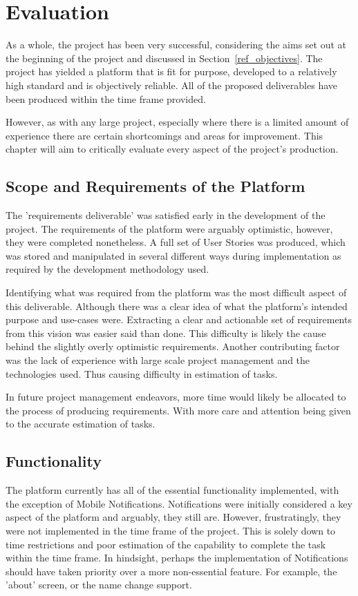 \chapter{Evaluation}
As a whole, the project has been very successful, considering the aims set out at the beginning of the project and discussed in Section~\ref{ref_objectives}. The project has yielded a platform that is fit for purpose, developed to a relatively high standard and is objectively reliable. All of the proposed deliverables have been produced within the time frame provided.

However, as with any large project, especially where there is a limited amount of experience there are certain shortcomings and areas for improvement. This chapter will aim to critically evaluate every aspect of the project's production.

\section{Scope and Requirements of the Platform}

The 'requirements deliverable' was satisfied early in the development of the project. The requirements of the platform were arguably optimistic, however, they were completed nonetheless. A full set of User Stories was produced, which was stored and manipulated in several different ways during implementation as required by the development methodology used.

Identifying what was required from the platform was the most difficult aspect of this deliverable. Although there was a clear idea of what the platform's intended purpose and use-cases were. Extracting a clear and actionable set of requirements from this vision was easier said than done. This difficulty is likely the cause behind the slightly overly optimistic requirements. Another contributing factor was the lack of experience with large scale project management and the technologies used. Thus causing difficulty in estimation of tasks.

In future project management endeavors, more time would likely be allocated to the process of producing requirements. With more care and attention being given to the accurate estimation of tasks.

\section{Functionality}
The platform currently has all of the essential functionality implemented, with the exception of Mobile Notifications. Notifications were initially considered a key aspect of the platform and arguably, they still are. However, frustratingly, they were not implemented in the time frame of the project. This is solely down to time restrictions and poor estimation of the capability to complete the task within the time frame. In hindsight, perhaps the implementation of Notifications should have taken priority over a more non-essential feature. For example, the 'about' screen, or the name change support.

